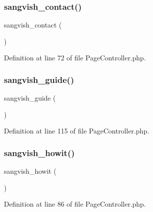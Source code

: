 \subsubsection{\texorpdfstring{sangvish\_contact()}{sangvish\_contact()}}
{\footnotesize\ttfamily sangvish\+\_\+contact (\begin{DoxyParamCaption}{ }\end{DoxyParamCaption})}



Definition at line 72 of file Page\+Controller.\+php.

\mbox{\label{class_responsive_1_1_http_1_1_controllers_1_1_page_controller_a9a336d720d76f207d96caf26ba6dfad1}} 
\subsubsection{\texorpdfstring{sangvish\_guide()}{sangvish\_guide()}}
{\footnotesize\ttfamily sangvish\+\_\+guide (\begin{DoxyParamCaption}{ }\end{DoxyParamCaption})}



Definition at line 115 of file Page\+Controller.\+php.

\mbox{\label{class_responsive_1_1_http_1_1_controllers_1_1_page_controller_a60b40c392d4702528efca5ddcba82fed}} 
\subsubsection{\texorpdfstring{sangvish\_howit()}{sangvish\_howit()}}
{\footnotesize\ttfamily sangvish\+\_\+howit (\begin{DoxyParamCaption}{ }\end{DoxyParamCaption})}



Definition at line 86 of file Page\+Controller.\+php.

\mbox{\label{class_responsive_1_1_http_1_1_controllers_1_1_page_controller_a71eea67654a78d7c904fbd54a099a055}} 
